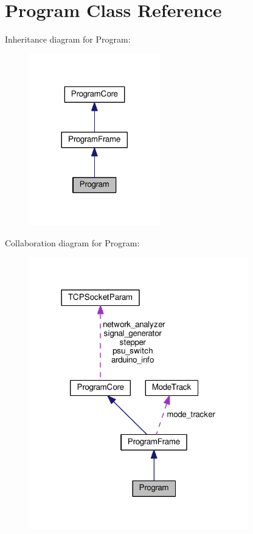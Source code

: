 \hypertarget{class_program}{}\section{Program Class Reference}
\label{class_program}


Inheritance diagram for Program\+:
\nopagebreak
\begin{figure}[H]
\begin{center}
\leavevmode
\includegraphics[width=161pt]{class_program__inherit__graph}
\end{center}
\end{figure}


Collaboration diagram for Program\+:
\nopagebreak
\begin{figure}[H]
\begin{center}
\leavevmode
\includegraphics[width=270pt]{class_program__coll__graph}
\end{center}
\end{figure}
